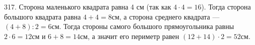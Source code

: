 317. Сторона маленького квадрата равна 4 см (так как $4\cdot4=16$). Тогда сторона большого квадрата равна $4+4=8$см, а сторона среднего квадрата --- $(4+8):2=6$см. Тогда стороны самого большого прямоугольника равны $2\cdot6=12$см и $6+8=14$см, а значит его периметр равен $(12+14)\cdot2=52$см.\\
